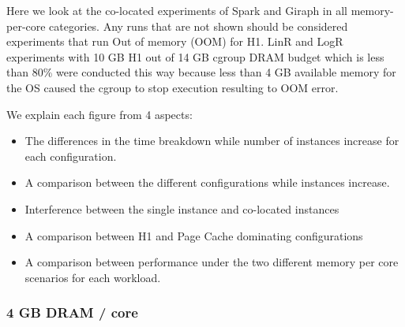 Here we look at the co-located experiments of Spark and Giraph in all memory-per-core categories.
Any runs that are not shown should be considered experiments that run Out of memory (OOM) for H1.
LinR and LogR experiments with 10 GB H1 out of 14 GB cgroup DRAM budget which is less than 80\% were conducted this way
because less than 4 GB available memory for the OS caused the cgroup to stop execution resulting to OOM error.

We explain each figure from 4 aspects:
\begin{itemize}
\item{The differences in the time breakdown while number of instances increase for each configuration.}
\item{A comparison between the different configurations while instances increase.}
\item{Interference between the single instance and co-located instances}
\item{A comparison between H1 and Page Cache dominating configurations}
\item{A comparison between performance under the two different memory per core scenarios for each workload.}
\end{itemize}

\subsubsection{4 GB DRAM / core}

